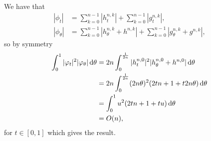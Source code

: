 We have that
\begin{equation*}
  \begin{aligned}
    |\phi_t| & = \sum_{k=0}^{n-1} |h^{n,k}_t| + \sum_{k=0}^{n-1}
    |g^{n,k}_t|, \\
    |\phi_{\theta}| & = \sum_{k=0}^{n-1} |h^{n,k}_{\theta} + h^{n,k} | +
    \sum_{k=0}^{n-1}
    |g^{n,k}_{\theta} + g^{n,k} |,
  \end{aligned}
\end{equation*}
so by symmetry
\begin{equation*}
  \begin{aligned}
    \int_{0}^{1}
    |\varphi_t|^2   |\varphi_{\theta}|
    \mathop{}\!\mathrm{d} \theta
    & =
    2n \int_{0}^{\frac{1}{2n}} |h^{n,0}_t|^2 |h^{n,0}_{\theta} + h^{n,0} |
    \mathop{}\!\mathrm{d} \theta \\
    & = 2n \int_{0}^{\frac{1}{2n}}
    (2n\theta)^2(2tn+1+t2n\theta) \mathop{}\!\mathrm{d} \theta \\
    & = \int_{0}^1
    u^2(2tn+1+t u) \mathop{}\!\mathrm{d} \theta \\
    & = O(n),
  \end{aligned}
\end{equation*}
for $t\in[0,1]$ which gives the result.

